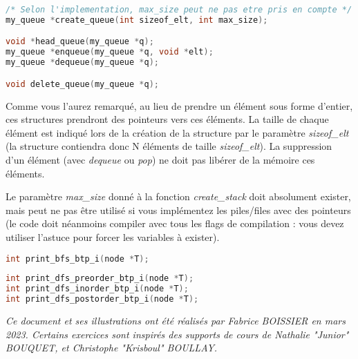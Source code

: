 \documentclass[11pt,a4paper]{article}
\begin{document}



\begin{lstlisting}[language=C]
/* Selon l'implementation, max_size peut ne pas etre pris en compte */
my_queue *create_queue(int sizeof_elt, int max_size);

void *head_queue(my_queue *q);
my_queue *enqueue(my_queue *q, void *elt);
my_queue *dequeue(my_queue *q);

void delete_queue(my_queue *q); \end{lstlisting}


Comme vous l'aurez remarqué, au lieu de prendre un élément sous forme d'entier, ces structures prendront des pointeurs vers ces éléments.
La taille de chaque élément est indiqué lors de la création de la structure par le paramètre \textit{sizeof\_elt} (la structure contiendra donc N éléments de taille \textit{sizeof\_elt}).
La suppression d'un élément (avec \textit{dequeue} ou \textit{pop}) ne doit pas libérer de la mémoire ces éléments.

Le paramètre \textit{max\_size} donné à la fonction \textit{create\_stack} doit absolument exister, mais peut ne pas être utilisé si vous implémentez les piles/files avec des pointeurs (le code doit néanmoins compiler avec tous les flags de compilation : vous devez utiliser l'astuce pour forcer les variables à exister).


\bigskip


\begin{lstlisting}[language=C]
int print_bfs_btp_i(node *T); \end{lstlisting}


\bigskip


\begin{lstlisting}[language=C]
int print_dfs_preorder_btp_i(node *T);
int print_dfs_inorder_btp_i(node *T);
int print_dfs_postorder_btp_i(node *T); \end{lstlisting}




\bigskip

\vfillFirst

\vfillLast


\begin{center}
\textit{Ce document et ses illustrations ont été réalisés par Fabrice BOISSIER en mars 2023.
Certains exercices sont inspirés des supports de cours de Nathalie "Junior" BOUQUET, et Christophe "Krisboul" BOULLAY.}
\end{center}
\end{document}
